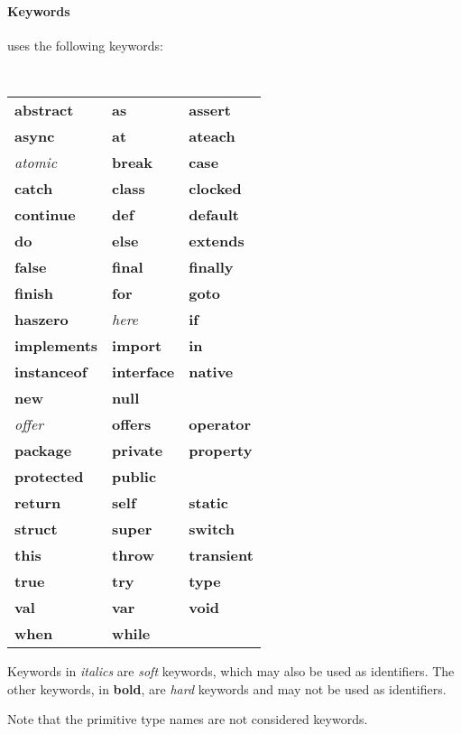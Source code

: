 \paragraph{Keywords}
\Xten{} uses the following keywords:\\
{\tt 
\begin{tabular}{lll}
    {\bf abstract} &
    {\bf as}&
    {\bf assert}\\
    {\bf async}&
    {\bf at}&
    {\bf ateach}\\
    {\it atomic}&
    {\bf break}&
    {\bf case}\\
    {\bf catch}&
    {\bf class}&
    {\bf clocked}\\
    {\bf continue}&
    {\bf def}&
    {\bf default}\\
    {\bf do}&
    {\bf else}&
    {\bf extends}\\
    {\bf false}&
    {\bf final}&
    {\bf finally}\\
    {\bf finish}&
    {\bf for}&
    {\bf goto}\\
    {\bf haszero}&
    {\it here}&
    {\bf if}\\
    {\bf implements}&
    {\bf import}&
    {\bf in}\\
    {\bf instanceof}&
    {\bf interface}&
    {\bf native}\\
    {\bf new}&
    {\bf null}\\
    {\it offer}&
    {\bf offers}&
    {\bf operator}\\
    {\bf package}&
    {\bf private}&
    {\bf property}\\
    {\bf protected}&
    {\bf public}\\
    {\bf return}&
    {\bf self}&
    {\bf static}\\
    {\bf struct}&
    {\bf super}&
    {\bf switch}\\
    {\bf this}&
    {\bf throw}&
    {\bf transient}\\
    {\bf true}&
    {\bf try}&
    {\bf type}\\
    {\bf val}&
    {\bf var}&
    {\bf void}\\
    {\bf when}& 
    {\bf while}&
\end{tabular}
}

Keywords in {\em italics} are {\em soft} keywords, which may also be
used as identifiers.  The other keywords, in {\bf bold}, are {\em hard}
keywords and  may not be used as identifiers.

Note that the primitive type names are not considered keywords.

